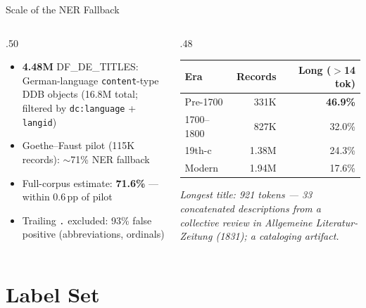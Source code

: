 \documentclass[xcolor,aspectratio=169,compress]{beamer}
\begin{document}
\begin{frame}{Scale of the NER Fallback}
  \small
  \begin{columns}
    \begin{column}{.50\textwidth}
      \begin{itemize}\setlength{\itemsep}{3pt}
        \item \textbf{4.48M} DF\_DE\_TITLES: German-language \texttt{content}-type DDB objects
              (16.8M total; filtered by \texttt{dc:language} + \texttt{langid})
        \item Goethe--Faust pilot (115K records): $\sim$71\% NER fallback
        \item Full-corpus estimate: \textbf{71.6\%} --- within 0.6\,pp of pilot
        \item Trailing \texttt{.} excluded: 93\% false positive (abbreviations, ordinals)
      \end{itemize}
    \end{column}
    \begin{column}{.48\textwidth}
      \begin{tabular}{lrr}
        \toprule
        Era & Records & Long ($>$14 tok) \\
        \midrule
        Pre-1700   & 331K   & \textbf{46.9\%} \\
        1700--1800 & 827K   & 32.0\% \\
        19th-c     & 1.38M  & 24.3\% \\
        Modern     & 1.94M  & 17.6\% \\
        \bottomrule
      \end{tabular}
      \smallskip

      \textit{Longest title: 921 tokens --- 33 concatenated descriptions from a collective review in
        \textit{Allgemeine Literatur-Zeitung} (1831); a cataloging artifact.}
    \end{column}
  \end{columns}
\end{frame}

\section{Label Set}
\end{document}
